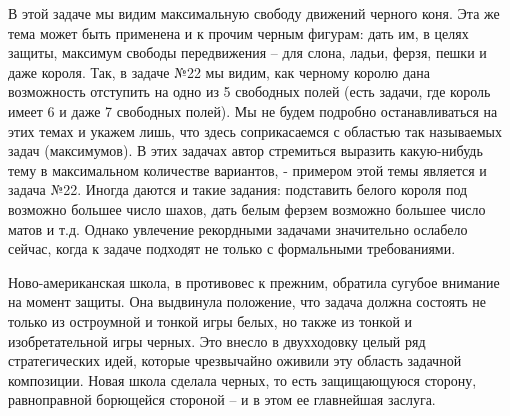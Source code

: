 В этой задаче мы видим максимальную свободу движений черного коня. Эта же тема может быть применена и к прочим черным фигурам: дать им, в целях защиты, максимум свободы передвижения -- для слона, ладьи, ферзя, пешки и даже короля. Так, в задаче №22 мы видим, как черному королю дана возможность отступить на одно из 5 свободных полей (есть задачи, где король имеет 6 и даже 7 свободных полей). Мы не будем подробно останавливаться на этих темах и укажем лишь, что здесь соприкасаемся с областью так называемых  задач (максимумов). В этих задачах автор стремиться выразить какую-нибудь тему в максимальном количестве вариантов, - примером этой темы является и задача №22. Иногда даются и такие задания: подставить белого короля под возможно большее число шахов, дать белым ферзем возможно большее число матов и т.д. Однако увлечение рекордными задачами значительно ослабело сейчас, когда к задаче подходят не только с формальными требованиями.

Ново-американская школа, в противовес к прежним, обратила сугубое внимание на момент защиты. Она выдвинула положение, что задача должна состоять не только из остроумной и тонкой игры белых, но также из тонкой и изобретательной игры черных. Это внесло в двухходовку целый ряд стратегических идей, которые чрезвычайно оживили эту область задачной композиции. Новая школа сделала черных, то есть защищающуюся сторону, равноправной борющейся стороной -- и в этом ее главнейшая заслуга.
